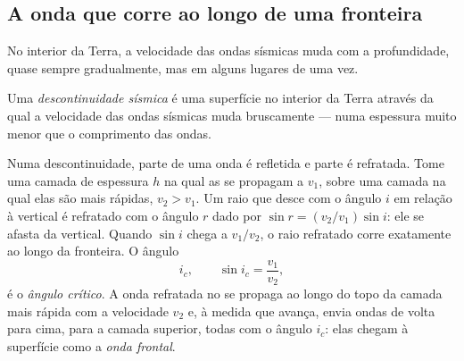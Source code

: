 \subsection{A onda que corre ao longo de uma fronteira}

No interior da Terra, a velocidade das ondas sísmicas muda com a
profundidade, quase sempre gradualmente, mas em alguns lugares de uma vez.

\begin{definition}\label{def:g11:seismic-structure:discontinuity}
Uma \emph{descontinuidade sísmica} é uma superfície
no interior da Terra através da qual a velocidade das ondas sísmicas muda
bruscamente --- numa espessura muito menor que o comprimento das ondas.
\end{definition}

Numa descontinuidade, parte de uma onda é refletida e parte é refratada.
Tome uma camada de espessura $h$ na qual as  se propagam a $v_1$,
sobre uma camada na qual elas são mais rápidas, $v_2 > v_1$. Um raio que
desce com o ângulo $i$ em relação à vertical é refratado com o ângulo $r$
dado por $\sin r = (v_2/v_1)\sin
i$: ele se afasta da vertical. Quando $\sin i$ chega a $v_1/v_2$, o
raio refratado corre exatamente ao longo da fronteira. O ângulo
\[
  i_c, \qquad \sin i_c = \frac{v_1}{v_2},
\]
é o \emph{ângulo crítico}. A onda
refratada no  se propaga ao longo do topo da camada mais
rápida com a velocidade $v_2$ e, à medida que avança, envia ondas de volta
para cima, para a camada superior, todas com o ângulo
$i_c$: elas chegam à superfície como a \emph{onda frontal}.

